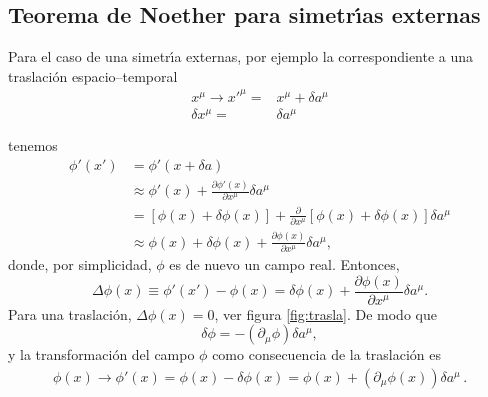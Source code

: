\subsection{Teorema de Noether para simetr\'\i as externas}
\begin{frame}
Para el caso de una simetr\'\i a externas, por ejemplo la correspondiente a una traslaci\'on espacio--temporal
\begin{align}
  x^\mu\to{x'}^\mu=&x^\mu+\delta a^\mu\nonumber\\
  \delta x^\mu=&\delta a^\mu
\end{align}

tenemos
\begin{align}
  \phi'(x')&=\phi'(x+\delta a)\\
  &\approx\phi'(x)+\frac{\partial\phi'(x)}{\partial x^\mu}\delta a^\mu\\
  &=[\phi(x)+\delta\phi(x)]+\frac{\partial}{\partial x^\mu}[\phi(x)+\delta\phi(x)]\delta a^\mu\\
  &\approx\phi(x)+\delta\phi(x)+\frac{\partial\phi(x)}{\partial x^\mu}\delta a^\mu,
\end{align}
donde, por simplicidad, $\phi$ es de nuevo un campo real. Entonces,
\begin{equation}
  \label{eq:Deltaf}
  \Delta\phi(x)\equiv\phi'(x')-\phi(x)=\delta\phi(x)+\frac{\partial\phi(x)}{\partial x^\mu}\delta a^\mu.
\end{equation}
Para una traslaci\'on, $\Delta\phi(x)=0$, ver figura 
\ref{fig:trasla}. %
De modo que
\begin{equation}
  \label{eq:dmuxmu}
  \delta\phi=-(\partial_\mu\phi)\delta a^\mu,
\end{equation}
y la transformaci\'on del campo $\phi$ como consecuencia de la traslaci\'on es
\begin{align}
  \phi(x)\to\phi'(x)=\phi(x)-\delta\phi(x)=\phi(x)+(\partial_\mu\phi(x))\delta a^\mu\,.
\end{align}


\end{frame}
